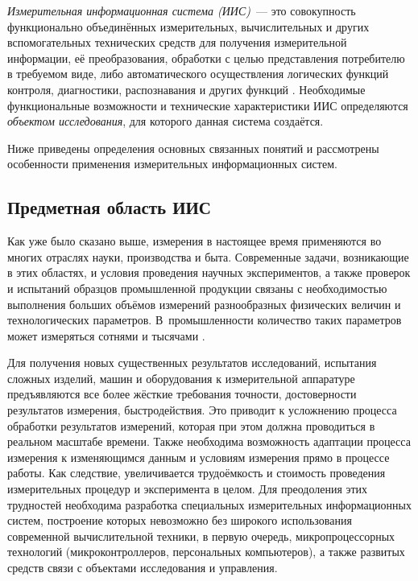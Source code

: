 \documentclass[a4paper, 14pt, titlepage]{extarticle}
\newcommand{\term}[1]{\emph{#1}}
\begin{document}
  \term{Измерительная информационная система (ИИС)}~--- это совокупность функционально объединённых
  измерительных, вычислительных и других вспомогательных технических средств для получения
  измерительной информации, её преобразования, обработки с целью представления потребителю в
  требуемом виде, либо автоматического осуществления логических функций контроля, диагностики,
  распознавания и других функций \cite[с.~9]{volkov-iis}.
  Необходимые функциональные возможности и технические характеристики ИИС определяются
  \term{объектом исследования}, для которого данная система создаётся.

  Ниже приведены определения основных связанных понятий и рассмотрены особенности применения
  измерительных информационных систем.

  \subsection{Предметная область ИИС}

  Как уже было сказано выше, измерения в настоящее время применяются
  во многих отраслях науки, производства и быта. Современные задачи, возникающие в этих областях,
  и условия проведения научных экспериментов, а также проверок и испытаний образцов промышленной
  продукции связаны с необходимостью выполнения
  больших объёмов измерений разнообразных физических величин и технологических параметров.
  В~промышленности количество таких параметров может измеряться сотнями и тысячами \cite{hashemian-nuclear}.

  Для получения новых существенных результатов исследований, испытания сложных изделий, машин и
  оборудования к измерительной аппаратуре предъявляются все более жёсткие требования
  точности, достоверности результатов измерения, быстродействия. Это приводит к усложнению
  процесса обработки результатов измерений, которая при этом должна проводиться в реальном масштабе
  времени. Также необходима возможность адаптации процесса измерения к изменяющимся данным и условиям
  измерения прямо в процессе работы. Как следствие, увеличивается трудоёмкость и стоимость
  проведения измерительных процедур и эксперимента в целом. Для преодоления этих трудностей
  необходима разработка специальных измерительных информационных систем, построение которых
  невозможно без широкого использования современной вычислительной техники, в первую очередь,
  микропроцессорных технологий (микроконтроллеров, персональных компьютеров), а также развитых
  средств связи с объектами исследования и управления.
\end{document}
